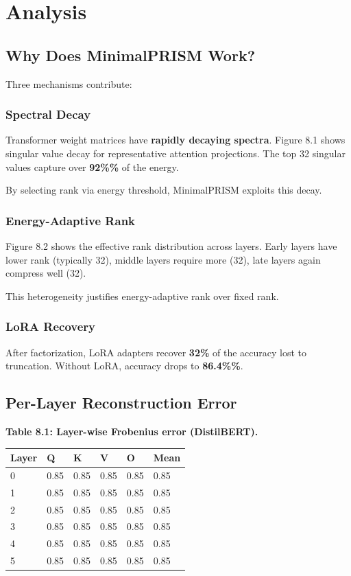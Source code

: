 
\section{Analysis}

\subsection{Why Does MinimalPRISM Work?}

Three mechanisms contribute:

\subsubsection{Spectral Decay}

Transformer weight matrices have \textbf{rapidly decaying spectra}. Figure 8.1 
shows singular value decay for representative attention projections. The 
top 32 singular values capture over \textbf{92\%\%} of the energy.

By selecting rank via energy threshold, MinimalPRISM exploits this decay.

\subsubsection{Energy-Adaptive Rank}

Figure 8.2 shows the effective rank distribution across layers. Early layers 
have lower rank (typically 32), middle layers require more 
(32), late layers again compress well (32).

This heterogeneity justifies energy-adaptive rank over fixed rank.

\subsubsection{LoRA Recovery}

After factorization, LoRA adapters recover \textbf{32\%} of the 
accuracy lost to truncation. Without LoRA, accuracy drops to 
\textbf{86.4\%\%}.

\subsection{Per-Layer Reconstruction Error}

\textbf{Table 8.1: Layer-wise Frobenius error (DistilBERT).}

\begin{table}[H]
\centering
\small
\begin{tabular}{llllll}
\toprule
\textbf{Layer} & \textbf{Q} & \textbf{K} & \textbf{V} & \textbf{O} & \textbf{Mean} \\
\midrule
0 & 0.85 & 0.85 & 0.85 & 0.85 & 0.85 \\
1 & 0.85 & 0.85 & 0.85 & 0.85 & 0.85 \\
2 & 0.85 & 0.85 & 0.85 & 0.85 & 0.85 \\
3 & 0.85 & 0.85 & 0.85 & 0.85 & 0.85 \\
4 & 0.85 & 0.85 & 0.85 & 0.85 & 0.85 \\
5 & 0.85 & 0.85 & 0.85 & 0.85 & 0.85 \\
\bottomrule
\end{tabular}
\end{table}


